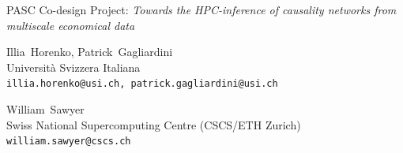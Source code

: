 \documentclass[a0,portrait]{a0poster}
\begin{document}
\begin{center}
\parbox{0.98\textwidth}{
\begin{center}
\LARGE
\sf
PASC Co-design Project:  {\em Towards the HPC-inference of causality networks from multiscale economical data}
\end{center}
}
\end{center}
\begin{center}
\parbox{0.48\textwidth}{
    \small
    \begin{center}
    Illia~Horenko, Patrick~Gagliardini \\
    Universit\`a Svizzera Italiana \\
    {\tt illia.horenko@usi.ch, patrick.gagliardini@usi.ch}
    \end{center}
}
\parbox{0.48\textwidth}{
    \small
    \begin{center}
    William~Sawyer\\
    Swiss National Supercomputing Centre (CSCS/ETH Zurich) \\
    {\tt william.sawyer@cscs.ch}
    \end{center}
}
\end{center}
\vspace{1cm}
\end{document}
